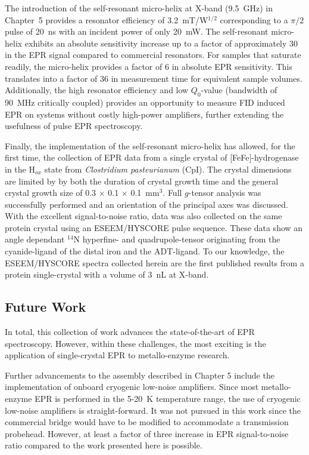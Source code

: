 The introduction of the self-resonant micro-helix at X-band (9.5~GHz) in Chapter~5 provides a resonator efficiency of 3.2~mT/W$^{1/2}$ corresponding to a $\pi/2$ pulse of 20~ns with an incident power of only 20~mW. The self-resonant micro-helix exhibits an absolute sensitivity increase up to a factor of approximately 30 in the EPR signal compared to commercial resonators. For samples that saturate readily, the micro-helix provides a factor of 6 in absolute EPR sensitivity. This translates into a factor of 36 in measurement time for equivalent sample volumes. Additionally, the high resonator efficiency and low $Q_0$-value (bandwidth of 90~MHz critically coupled) provides an opportunity to measure FID induced EPR on systems without costly high-power amplifiers, further extending the usefulness of pulse EPR spectroscopy.

Finally, the implementation of the self-resonant micro-helix has allowed, for the first time, the collection of EPR data from a single crystal of [FeFe]-hydrogenase in the H$_{ox}$ state from {\em Clostridium pasteurianum} (CpI). The crystal dimensions are limited by by both the duration of crystal growth time and the general crystal growth size of 0.3 $\times$ 0.1 $\times$ 0.1~mm$^3$. Full $g$-tensor analysis was successfully performed and an orientation of the principal axes was discussed. With the excellent signal-to-noise ratio, data was also collected on the same protein crystal using an ESEEM/HYSCORE pulse sequence. These data show an angle dependant $^{14}$N hyperfine- and quadrupole-tensor originating from the cyanide-ligand of the distal iron and the ADT-ligand. To our knowledge, the ESEEM/HYSCORE spectra collected herein are the first published results from a protein single-crystal with a volume of 3~nL at X-band. 

\subsection*{Future Work}

In total, this collection of work advances the state-of-the-art of EPR spectroscopy. However, within these challenges, the most exciting is the application of single-crystal EPR to metallo-enzyme research. 

Further advancements to the assembly described in Chapter 5 include the implementation of onboard cryogenic low-noise amplifiers. Since most metallo-enzyme EPR is performed in the 5-20~K temperature range, the use of cryogenic low-noise amplifiers is straight-forward. It was not pursued in this work since the commercial bridge would have to be modified to accommodate a transmission probehead. However, at least a factor of three increase in EPR signal-to-noise ratio compared to the work presented here is possible. \cite{NARKOWICZ201379} 

